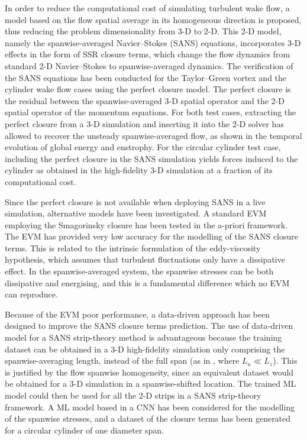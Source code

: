 \documentclass[../main.tex]{subfiles}
\begin{document}
In order to reduce the computational cost of simulating turbulent wake flow, a model based on the flow spatial average in its homogeneous direction is proposed, thus reducing the problem dimensionality from 3-D to 2-D.
This 2-D model, namely the spanwise-averaged Navier--Stokes (SANS) equations, incorporates 3-D effects in the form of SSR closure terms, which change the flow dynamics from standard 2-D Navier--Stokes to spanwise-averaged dynamics.
The verification of the SANS equations has been conducted for the Taylor--Green vortex and the cylinder wake flow cases using the perfect closure model.
The perfect closure is the residual between the spanwise-averaged 3-D spatial operator and the 2-D spatial operator of the momentum equations.
For both test cases, extracting the perfect closure from a 3-D simulation and inserting it into the 2-D solver has allowed to recover the unsteady spanwise-averaged flow, as shown in the temporal evolution of global energy and enstrophy. 
For the circular cylinder test case, including the perfect closure in the SANS simulation yields forces induced to the cylinder as obtained in the high-fidelity 3-D simulation at a fraction of its computational cost.

Since the perfect closure is not available when deploying SANS in a live simulation, alternative models have been investigated.
A standard EVM employing the Smagorinsky closure has been tested in the a-priori framework.
The EVM has provided very low accuracy for the modelling of the SANS closure terms.
This is related to the intrinsic formulation of the eddy-viscosity hypothesis, which assumes that turbulent fluctuations only have a dissipative effect.
In the spanwise-averaged system, the spanwise stresses can be both dissipative and energising, and this is a fundamental difference which no EVM can reproduce.

Because of the EVM poor performance, a data-driven approach has been designed to improve the SANS closure terms prediction.
The use of data-driven model for a SANS strip-theory method is advantageous because the training dataset can be obtained in a 3-D high-fidelity simulation only comprising the spanwise-averaging length, instead of the full span (as in , where $L_a\ll L_z$).
This is justified by the flow spanwise homogeneity, since an equivalent dataset would be obtained for a 3-D simulation in a spanwise-shifted location.
The trained ML model could then be used for all the 2-D strips in a SANS strip-theory framework.
A ML model based in a CNN has been considered for the modelling of the spanwise stresses, and a dataset of the closure terms has been generated for a circular cylinder of one diameter span.
\end{document}

